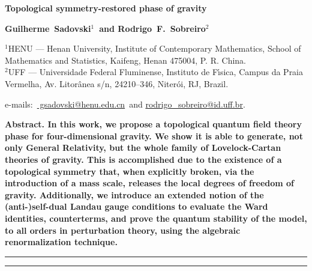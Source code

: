 \documentclass[main.tex]{subfiles}
\begin{document}
\thispagestyle{empty}
{
\noindent
\Large
\bfseries
Topological symmetry-restored phase of gravity
\bigskip
\bigskip
}

{
\noindent
\bfseries
Guilherme~Sadovski${}^{1}${\normalfont~and}
Rodrigo~F.~Sobreiro${}^{2}$
\bigskip
}

{
\noindent
\footnotesize
${}^{1}$HENU --- Henan University, Institute of Contemporary Mathematics, School of Mathematics and Statistics, Kaifeng, Henan 475004, P. R. China. \\
${}^{2}$UFF --- Universidade Federal Fluminense, Instituto de F{\'{\i}}sica, Campus da Praia Vermelha, Av. Litor{\^{a}}nea s/n, 24210--346, Niter{\'{o}}i, RJ, Brazil.
\bigskip
\bigskip
}

{
\noindent
\footnotesize
\rmfamily
e-mails:~\href{
  mailto:gsadovski@henu.edu.cn}{
  gsadovski@henu.edu.cn}{\normalfont~and}
\href{
  mailto:rodrigo\_sobreiro@id.uff.br
}{
  rodrigo\_sobreiro@id.uff.br}{\normalfont.}
\bigskip
}

{
\noindent
\bfseries
Abstract.
\normalfont{}
In this work, we propose a topological quantum field theory phase for four-dimensional gravity. We show it is able to generate, not only General Relativity, but the whole family of Lovelock-Cartan theories of gravity. This is accomplished due to the existence of a topological symmetry that, when explicitly broken, via the introduction of a mass scale, releases the local degrees of freedom of gravity. Additionally, we introduce an extended notion of the (anti-){}self-dual Landau gauge conditions to evaluate the Ward identities, counterterms, and prove the quantum stability of the model, to all orders in perturbation theory, using the algebraic renormalization technique.
\bigskip
}

{
\noindent
\rule{\textwidth}{1pt}
\tableofcontents
\smallskip
\noindent
\rule{\linewidth}{1pt}
}
\end{document}
